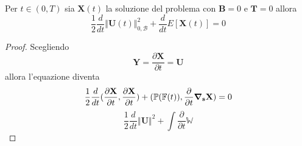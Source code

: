 Per $t\in (0,T)$ sia $\mathbf{X}(t)$ la soluzione del problema con $\mathbf{B}=0$ e $\mathbf{T}=0$ allora
\begin{equation*}
\frac{1}{2}\frac{d}{dt}\Vert\mathbf{U}(t)\Vert^2_{0,\mathcal{B}}+\frac{d}{dt}E[\mathbf{X}(t)]=0
\end{equation*}
\begin{proof}
Scegliendo
\begin{equation*}
\mathbf{Y}=\frac{\partial \mathbf{X}}{\partial t}=\mathbf{U}
\end{equation*}
allora l'equazione diventa
\begin{equation*}
\frac{1}{2}\frac{d}{dt}\ps{\frac{\partial\mathbf{X}}{\partial t}}{\frac{\partial \mathbf{X}}{\partial t}} + \ps{\mathbb{P}(\mathbb{F}(t))}{\frac{\partial}{\partial t} \Nabla_\mathbf{s} \mathbf{X}} = 0
\end{equation*}
\begin{equation*}
\frac{1}{2}\frac{d}{dt}\Vert\mathbf{U}\Vert^2 +\int\frac{\partial}{\partial t}\mathbb{W}\end{equation*}
\end{proof}
